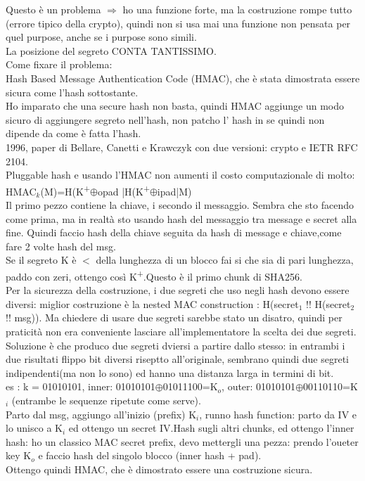 \documentclass[16px]{article}
\begin{document}
Questo è un problema $\Rightarrow$ ho una funzione forte, ma la costruzione rompe tutto (errore tipico della crypto), quindi non si usa mai una funzione non pensata per quel purpose, anche se i purpose sono simili.\\
La posizione del segreto CONTA TANTISSIMO.\\
Come fixare il problema:\\
Hash Based Message Authentication Code (HMAC), che è stata dimostrata essere sicura come l'hash sottostante.\\
Ho imparato che una secure hash non basta, quindi HMAC aggiunge un modo sicuro di aggiungere segreto nell'hash, non patcho l' hash in se quindi non dipende da come è fatta l'hash.\\
1996, paper di Bellare, Canetti e Krawczyk con due versioni: crypto e IETR RFC 2104.\\
Pluggable hash e usando l'HMAC non aumenti il costo computazionale di molto:\\
HMAC$_{k}$(M)=H(K\textsuperscript{+}$\oplus$opad |H(K\textsuperscript{+}$\oplus$ipad|M)\\
Il primo pezzo contiene la chiave, i secondo il messaggio. Sembra che sto facendo come prima, ma in realtà sto usando hash del messaggio tra message e secret alla fine. Quindi faccio hash della chiave seguita da hash di message e chiave,come fare 2 volte hash del msg.\\
Se il segreto K è $<$ della lunghezza di un blocco fai si che sia di pari lunghezza, paddo con zeri, ottengo così K\textsuperscript{+}.Questo è il primo chunk di SHA256.\\Per la sicurezza della costruzione, i due segreti che uso negli hash devono essere diversi: miglior costruzione è la nested MAC construction : H(secret$_{1}$ !! H(secret$_{2}$ !! msg)). Ma chiedere di usare due segreti sarebbe stato un disatro, quindi per praticità non era conveniente lasciare all'implementatore la scelta dei due segreti.\\Soluzione è che produco due segreti dviersi a partire dallo stesso: in entrambi i due risultati flippo bit diversi riseptto all'originale, sembrano quindi due segreti indipendenti(ma non lo sono) ed hanno una distanza larga in termini di bit.\\
es : k = 01010101, inner: 01010101$\oplus$01011100=K$_{o}$, outer: 01010101$\oplus$00110110=K$_{i}$ (entrambe le sequenze ripetute come serve).\\
Parto dal msg, aggiungo all'inizio (prefix) K$_{i}$, runno hash function: parto da IV e lo unisco a K$_{i}$ ed ottengo un secret IV.Hash sugli altri chunks, ed ottengo l'inner hash: ho un classico MAC secret prefix, devo mettergli una pezza: prendo l'oueter key K$_{o}$ e faccio hash del singolo blocco (inner hash + pad).\\Ottengo quindi HMAC, che è dimostrato essere una costruzione sicura.\\
\end{document}
